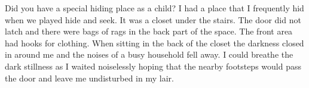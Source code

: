 Did you have a special hiding place as a child?
I had a place that I frequently hid when we played hide and seek.
It was a closet under the stairs.
The door did not latch and there were bags of rags in the back part of the space.
The front area had hooks for clothing.
When sitting in the back of the closet the darkness closed in around me and the noises of a busy household fell away.
I could breathe the dark stillness as I waited noiselessly hoping that the nearby footsteps would pass the door and leave me undisturbed in my lair.

